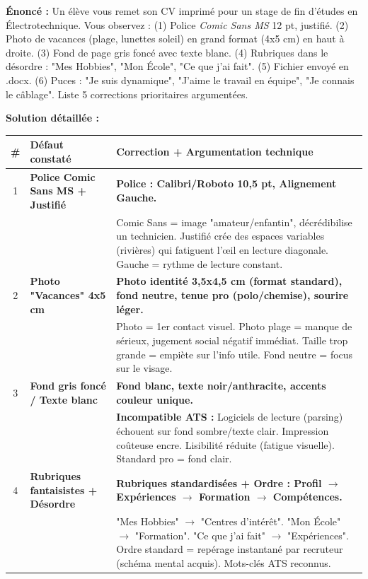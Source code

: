 \documentclass[11pt]{article}
\begin{document}
\begin{exoresolu}
\textbf{Énoncé :} Un élève vous remet son CV imprimé pour un stage de fin d'études en Électrotechnique. Vous observez : (1) Police \emph{Comic Sans MS} 12 pt, justifié. (2) Photo de vacances (plage, lunettes soleil) en grand format (4x5 cm) en haut à droite. (3) Fond de page gris foncé avec texte blanc. (4) Rubriques dans le désordre : "Mes Hobbies", "Mon École", "Ce que j'ai fait". (5) Fichier envoyé en .docx. (6) Puces : "Je suis dynamique", "J'aime le travail en équipe", "Je connais le câblage". Liste 5 corrections prioritaires argumentées.

\tcblower
\textbf{Solution détaillée :}

\begin{center}
\begin{tabularx}{\linewidth}{|c|X|X|}
\hline
\textbf{\#} & \textbf{Défaut constaté} & \textbf{Correction + Argumentation technique} \\ \hline
1 & \textbf{Police Comic Sans MS + Justifié} & \textbf{Police : Calibri/Roboto 10,5 pt, Alignement Gauche.} \\
  & & Comic Sans = image "amateur/enfantin", décrédibilise un technicien. Justifié crée des espaces variables (rivières) qui fatiguent l'œil en lecture diagonale. Gauche = rythme de lecture constant. \\ \hline
2 & \textbf{Photo "Vacances" 4x5 cm} & \textbf{Photo identité 3,5x4,5 cm (format standard), fond neutre, tenue pro (polo/chemise), sourire léger.} \\
  & & Photo = 1er contact visuel. Photo plage = manque de sérieux, jugement social négatif immédiat. Taille trop grande = empiète sur l'info utile. Fond neutre = focus sur le visage. \\ \hline
3 & \textbf{Fond gris foncé / Texte blanc} & \textbf{Fond blanc, texte noir/anthracite, accents couleur unique.} \\
  & & \textbf{Incompatible ATS :} Logiciels de lecture (parsing) échouent sur fond sombre/texte clair. Impression coûteuse encre. Lisibilité réduite (fatigue visuelle). Standard pro = fond clair. \\ \hline
4 & \textbf{Rubriques fantaisistes + Désordre} & \textbf{Rubriques standardisées + Ordre : Profil $\rightarrow$ Expériences $\rightarrow$ Formation $\rightarrow$ Compétences.} \\
  & & "Mes Hobbies" $\rightarrow$ "Centres d'intérêt". "Mon École" $\rightarrow$ "Formation". "Ce que j'ai fait" $\rightarrow$ "Expériences". Ordre standard = repérage instantané par recruteur (schéma mental acquis). Mots-clés ATS reconnus. \\ \hline

\end{tabularx}
\end{center}
\end{exoresolu}
\end{document}

